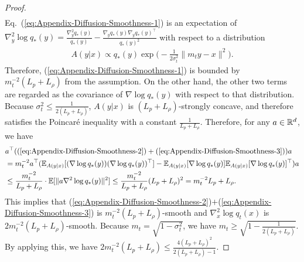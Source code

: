 \begin{proof}
\begin{align}
       \label{eq:Appendix-Diffusion-Smoothness-3}
    \end{align}
    Eq.~(\ref{eq:Appendix-Diffusion-Smoothness-1}) is an expectation of $\nabla_y^2 \log q_*(y) = \frac{\nabla_y^2 q_*(y)}{q_*(y)}-\frac{\nabla_y q_*(y)\nabla_y q_*(y)^\top}{q_*(y)^2}$ with respect to a distribution 
    \begin{align}
        A(y|x) \propto q_*(y)\exp\big(-\frac{1}{2\sigma_t^2}\|m_t y - x\|^2\big).
    \end{align}
    Therefore, (\ref{eq:Appendix-Diffusion-Smoothness-1}) is bounded by $m_t^{-2}(L_p+L_\rho)$ from the assumption.
    On the other hand, the other two terms are regarded as the covariance of $\nabla \log q_*(y)$ with respect to that distribution.
    Because $\sigma_t^2 \leq \frac{1}{2(L_p + L_\rho)}$, $A(y|x)$
    is $(L_p + L_\rho)$-strongly concave, and therefore satisfies the Poincar\'e inequality with a constant $\frac{1}{L_p + L_\rho}$. Therefore, for any $a\in \mathbb{R}^d$, we have
    \begin{align}
  &  a^\top (\text{(\ref{eq:Appendix-Diffusion-Smoothness-2})}+\text{(\ref{eq:Appendix-Diffusion-Smoothness-3})})a
  \\ &  = m_t^{-2}a^\top(\mathbb{E}_{A(y|x)}[(\nabla \log q_*(y))(\nabla \log q_*(y))^\top] - \mathbb{E}_{A(y|x)}[\nabla \log q_*(y)]\mathbb{E}_{A(y|x)}[\nabla \log q_*(y)]^\top)a
      \\ &    \leq \frac{m_t^{-2}}{L_p + L_\rho} \cdot \mathbb{E}[\|a\nabla^2 \log q_*(y)\|^2]\leq \frac{m_t^{-2}}{L_p + L_\rho}(L_p+L_\rho)^2 = m_t^{-2}L_p+L_\rho.
    \end{align}
    This implies that (\ref{eq:Appendix-Diffusion-Smoothness-2})$+$(\ref{eq:Appendix-Diffusion-Smoothness-3}) is $m_t^{-2}(L_p+L_\rho)$-smooth and $\nabla_x^2 \log q_t(x)$ is $2m_t^{-2}(L_p+L_\rho)$-smooth.
    Because $m_t = \sqrt{1-\sigma_t^2}$, we have $m_t \geq \sqrt{1-\frac{1}{2(L_p+L_\rho)}}.$ By applying this, we have $2m_t^{-2}(L_p+L_\rho)\leq \frac{4(L_p+L_\rho)^2}{2(L_p+L_\rho)-1}$.


\end{proof}
